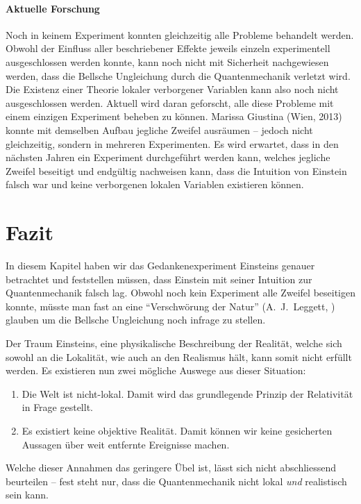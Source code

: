 \begin{refsection}
\paragraph{Aktuelle Forschung}
Noch in keinem Experiment konnten gleichzeitig alle Probleme behandelt werden.
Obwohl der Einfluss aller beschriebener Effekte jeweils einzeln experimentell
ausgeschlossen werden konnte, kann noch nicht mit Sicherheit nachgewiesen
werden, dass die Bellsche Ungleichung durch die Quantenmechanik verletzt wird.
Die Existenz einer Theorie lokaler verborgener Variablen kann also noch nicht
ausgeschlossen werden. 
Aktuell wird daran geforscht, alle diese Probleme mit einem einzigen Experiment
beheben zu k\"onnen. 
Marissa Giustina (Wien, 2013) \cite{Bell:Giustina2013} konnte mit demselben 
Aufbau jegliche Zweifel ausr\"aumen -- jedoch nicht gleichzeitig, sondern in 
mehreren Experimenten.
Es wird erwartet, dass in den n\"achsten Jahren ein Experiment durchgef\"uhrt
werden kann, welches jegliche Zweifel beseitigt und endg\"ultig nachweisen
kann, dass die Intuition von Einstein falsch war und keine verborgenen
lokalen Variablen existieren k\"onnen.

\section{Fazit}
In diesem Kapitel haben wir das Gedankenexperiment Einsteins genauer betrachtet
und feststellen m\"ussen, dass Einstein mit seiner Intuition zur Quantenmechanik
falsch lag.
Obwohl noch kein Experiment alle Zweifel beseitigen konnte, m\"usste man fast
an eine 
\enquote{Verschw\"orung der Natur} (A.~J.~Leggett, \cite{Bell:Leggett2003})
glauben um die Bellsche Ungleichung noch infrage zu stellen.

Der Traum Einsteins, eine physikalische Beschreibung der Realit\"at, welche sich
sowohl an die Lokalit\"at, wie auch an den Realismus h\"alt, kann somit nicht 
erf\"ullt werden.
Es existieren nun zwei m\"ogliche Auswege aus dieser Situation:
\begin{enumerate}[label=(\roman*)]
    \item Die Welt ist nicht-lokal. Damit wird das grundlegende Prinzip der
        Relativit\"at in Frage gestellt.
    \item Es existiert keine objektive Realit\"at. Damit k\"onnen wir keine
        gesicherten Aussagen \"uber weit entfernte Ereignisse machen.
\end{enumerate}
Welche dieser Annahmen das geringere \"Ubel ist, l\"asst sich nicht
abschliessend beurteilen -- fest steht nur, dass die Quantenmechanik
nicht lokal \emph{und} realistisch sein kann.

\printbibliography[heading=subbibliography]
\end{refsection}

